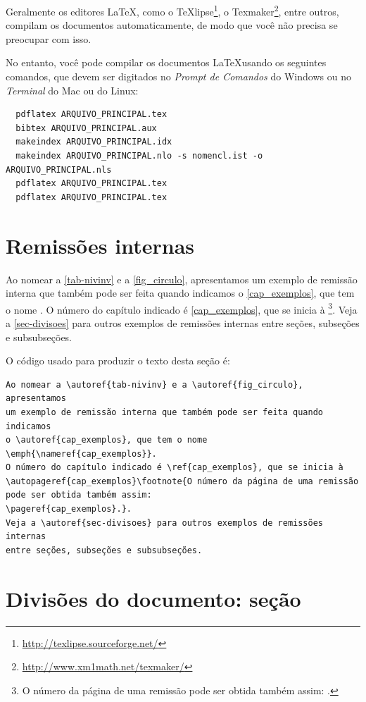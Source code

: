 Geralmente os editores \LaTeX, como o
TeXlipse\footnote{\url{http://texlipse.sourceforge.net/}}, o
Texmaker\footnote{\url{http://www.xm1math.net/texmaker/}}, entre outros,
compilam os documentos automaticamente, de modo que você não precisa se
preocupar com isso.

No entanto, você pode compilar os documentos \LaTeX usando os seguintes
comandos, que devem ser digitados no \emph{Prompt de Comandos} do Windows ou no
\emph{Terminal} do Mac ou do Linux:
\begin{verbatim}
  pdflatex ARQUIVO_PRINCIPAL.tex
  bibtex ARQUIVO_PRINCIPAL.aux
  makeindex ARQUIVO_PRINCIPAL.idx 
  makeindex ARQUIVO_PRINCIPAL.nlo -s nomencl.ist -o ARQUIVO_PRINCIPAL.nls
  pdflatex ARQUIVO_PRINCIPAL.tex
  pdflatex ARQUIVO_PRINCIPAL.tex
\end{verbatim}

\section{Remissões internas}

Ao nomear a \autoref{tab-nivinv} e a \autoref{fig_circulo}, apresentamos
um exemplo de remissão interna que também pode ser feita quando indicamos
o \autoref{cap_exemplos}, que tem o nome \emph{}.
O número do capítulo indicado é \ref{cap_exemplos}, que se inicia à
\footnote{O número da página de uma remissão
pode ser obtida também assim:
\pageref{cap_exemplos}.}.
Veja a \autoref{sec-divisoes} para outros exemplos de remissões internas
entre seções, subseções e subsubseções.

O código usado para produzir o texto desta seção é:
\begin{verbatim}
Ao nomear a \autoref{tab-nivinv} e a \autoref{fig_circulo}, apresentamos
um exemplo de remissão interna que também pode ser feita quando indicamos
o \autoref{cap_exemplos}, que tem o nome \emph{\nameref{cap_exemplos}}.
O número do capítulo indicado é \ref{cap_exemplos}, que se inicia à
\autopageref{cap_exemplos}\footnote{O número da página de uma remissão
pode ser obtida também assim:
\pageref{cap_exemplos}.}.
Veja a \autoref{sec-divisoes} para outros exemplos de remissões internas
entre seções, subseções e subsubseções.
\end{verbatim}

\section{Divisões do documento: seção}\label{sec-divisoes}

